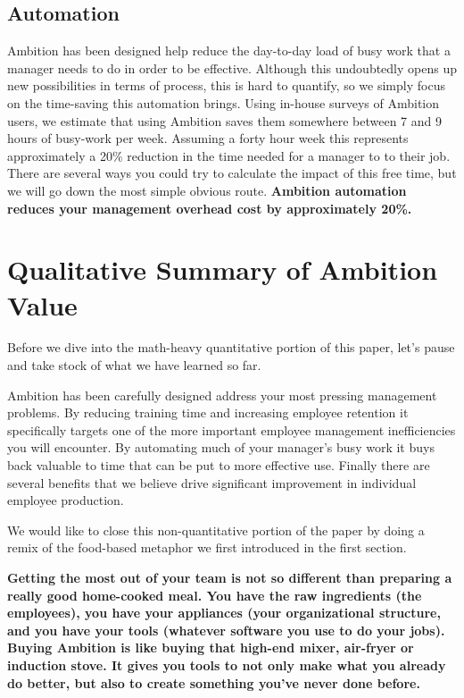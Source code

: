 \documentclass[paper=a4, fontsize=11pt abstract]{scrartcl}
\numberwithin{equation}{section}		%
\numberwithin{figure}{section}			%
\numberwithin{table}{section}				%
\begin{document}
\subsection{Automation}
Ambition has been designed help reduce the day-to-day load of busy work that a manager needs to do in order to be effective.  Although this undoubtedly opens up new possibilities in terms of process, this is hard to quantify, so we simply focus on the time-saving this automation brings.  Using in-house surveys of Ambition users, we estimate that using Ambition saves them somewhere between 7 and 9 hours of busy-work per week.  Assuming a forty hour week this represents approximately a 20\% reduction in the time needed for a manager to to their job.  There are several ways you could try to calculate the impact of this free time, but we will go down the most simple obvious route.  \textbf{Ambition automation reduces your management overhead cost by approximately 20\%.}

\section{Qualitative Summary of Ambition Value}
Before we dive into the math-heavy quantitative portion of this paper, let's pause and take stock of what we have learned so far.

Ambition has been carefully designed address your most pressing management problems.  By reducing training time and increasing employee retention it specifically targets one of the more important employee management inefficiencies you will encounter.  By automating much of your manager's busy work it buys back valuable to time that can be put to more effective use.  Finally there are several benefits that we believe drive significant improvement in individual employee production.

We would like to close this non-quantitative portion of the paper by doing a remix of the food-based metaphor we first introduced in the first section.

\textbf{Getting the most out of your team is not so different than preparing a really good home-cooked meal. You have the raw ingredients (the employees), you have your appliances (your organizational structure, and you have your tools (whatever software you use to do your jobs).  Buying Ambition is like buying that high-end mixer, air-fryer or induction stove.  It gives you tools to not only make what you already do better, but also to create something you've never done before.}
\end{document}
